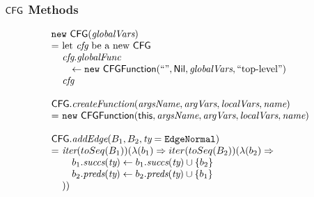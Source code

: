 \subsubsection{$\mbox{\textsf{CFG}}$ Methods}
\[
\begin{array}{l@{}l@{~}l}
\lefteqn{\new\ \CFG(\emph{globalVars})}\\
& = & \text{let } \emph{cfg} \text{ be a new } \CFG\\
& & \emph{cfg}.\emph{globalFunc} \\
& & \quad \leftarrow \new\ \CFGFunction(``", \Nil, \emph{globalVars}, ``\text{top-level}")\\
& & \emph{cfg}\\
& & \\

\lefteqn{\CFG.\emph{createFunction}(\emph{argsName}, \emph{argVars}, \emph{localVars}, \emph{name})}\\
& = & \new\ \CFGFunction(\this, \emph{argsName}, \emph{argVars}, \emph{localVars}, \emph{name})\\
& & \\

\lefteqn{\CFG.\emph{addEdge}(B_1, B_2, \emph{ty} = \EdgeNormal)}\\
& = & \iter(toSeq(B_1))(\lambda(b_1) \Rightarrow iter(toSeq(B_2))(\lambda(b_2) \Rightarrow \\
& & \quad b_1.\emph{succs}(\emph{ty}) \leftarrow b_1.\emph{succs}(\emph{ty}) \cup \{b_2\} \\
& & \quad b_2.\emph{preds}(\emph{ty}) \leftarrow b_2.\emph{preds}(\emph{ty}) \cup \{b_1\} \\
& & )) \\
\end{array}
\]


